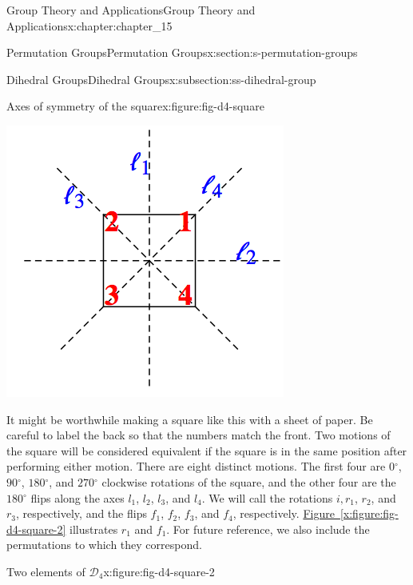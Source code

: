 \documentclass[oneside,10pt,]{book}
\newcommand{\xreffont}{\relax}
\numberwithin{equation}{section}
\begin{document}
\begin{chapterptx}{Group Theory and Applications}{}{Group Theory and Applications}{}{}{x:chapter:chapter_15}
\begin{sectionptx}{Permutation Groups}{}{Permutation Groups}{}{}{x:section:s-permutation-groups}
\begin{subsectionptx}{Dihedral Groups}{}{Dihedral Groups}{}{}{x:subsection:ss-dihedral-group}
\begin{figureptx}{Axes of symmetry of the square}{x:figure:fig-d4-square}{}
\begin{image}{0.15}{0.7}{0.15}
\includegraphics[width=\linewidth]{images/fig-d4-square.png}
\end{image}%
\tcblower
\end{figureptx}%
It might be worthwhile making a square like this with a sheet of paper. Be careful to label the back so that the numbers match the front. Two motions of the square will be considered equivalent if the square is in the same position after performing either motion. There are eight distinct motions. The first four are \(0{}^{\circ}\), \(90{}^{\circ}\), \(180{}^{\circ}\), and \(270{}^{\circ}\) clockwise rotations of the square, and the other four are the \(180{}^{\circ}\) flips along the axes \(l_1\), \(l_2\), \(l_3\), and \(l_4\). We will call the rotations \(i, r_1\), \(r_2\), and \(r_3\), respectively, and the flips \(f_1\), \(f_2\), \(f_3\), and \(f_4\), respectively. \hyperref[x:figure:fig-d4-square-2]{Figure~{\xreffont\ref{x:figure:fig-d4-square-2}}} illustrates \(r_1\) and \(f_1\).  For future reference, we also include the permutations to which they correspond.%
\begin{figureptx}{Two elements of \(\mathcal{D}_4\)}{x:figure:fig-d4-square-2}{}%
\begin{image}{0.15}{0.7}{0.15}%

\end{image}
\end{figureptx}
\end{subsectionptx}
\end{sectionptx}
\end{chapterptx}
\end{document}
